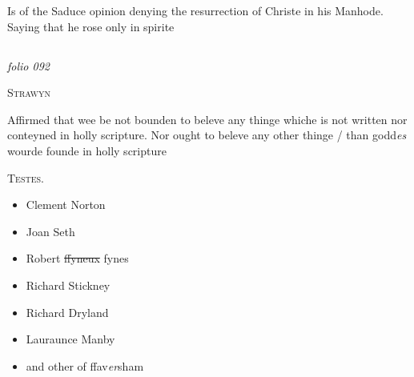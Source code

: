 \documentclass[12pt, a4paper]{book}
\begin{document}
            	
			
            		
		\ifthenelse{\isodd{\thepage}}
		{\reversemarginpar}
		{\normalmarginpar}
		Is of the Saduce opinion denying the resurrection
 of Christe in his Manhode. Saying that he rose
 only in spirite


            
\dotfill
						\newpage {} \subsection*{}  \subsection*{}  \subsection*{}

\textit{folio 092}


            
               
				\begin{center} \begin{large} {\scshape Strawyn} \end{large} \end{center}
			
            	
            		
			
            	
		\ifthenelse{\isodd{\thepage}}
		{\reversemarginpar}
		{\normalmarginpar}
		Affirmed that wee be not bounden to beleve
  any thinge whiche is not written nor conteyned
 in holly scripture. Nor ought to beleve any other
 thinge / than godd\textit{es} wourde founde in holly scripture
            	
 
 	\begin{center} {\scshape Testes.} \end{center}\begin{itemize}
 	
 		\item[]Clement Norton
 		\item[]Joan Seth
 		\item[]Robert \sout{ffyneux} fynes
 		\item[]Richard Stickney
 		\item[]Richard Dryland
 		\item[]Lauraunce Manby
 		\item[]and other of ffav\textit{er}sham
 	\end{itemize}
 	
\end{document}
